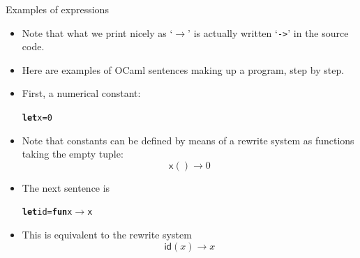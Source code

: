 \documentclass[compress,dvipdfmx]{beamer}
\newcommand{\OCaml}{\textsf{OCaml}\xspace}
\newcommand\fun[1]{\textsf{#1}}
\begin{document}
%
\begin{frame}[fragile]{Examples of expressions}

  \begin{itemize}

    \item Note that what we print nicely as `\(\rightarrow\)' is
      actually written `\texttt{->}' in the source code.

    \item Here are examples of \OCaml sentences making up a program,
      step by step.

    \item First, a numerical constant:
      \vspace*{-3mm}
\begin{alltt}
\small
\textbf{let} x = 0
\end{alltt}

    \item Note that constants can be defined by means of a rewrite
      system as functions taking the empty tuple:
      \begin{equation*}
        \fun{x}() \rightarrow 0
      \end{equation*}

    \item The next sentence is
      \vspace*{-3mm}
\begin{alltt}
\small
\textbf{let} id = \textbf{fun} x \(\rightarrow\) x
\end{alltt}

    \item This is equivalent to the rewrite system
      \begin{equation*}
        \fun{id}(x) \rightarrow x
      \end{equation*}

  \end{itemize}

\end{frame}
\end{document}
